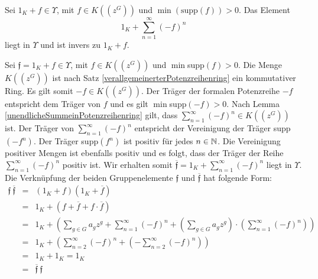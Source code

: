 %
%
%
%
%
%
%
%
%
%
%
%
%
%
%
%
%
\begin{lemma}
Sei $1_K + f \in \Upsilon$, mit $f \in K\left(\left(z^{G}\right)\right)$ und $\min(\text{supp}(f)) >0$. Das Element 
\[1_K +\sum_{n=1}^{\infty}(-f)^n\]
liegt in $\Upsilon$ und ist invers zu $1_K + f$.

\end{lemma}
Sei $\mathfrak{f} = 1_K + f \in \Upsilon$, mit $f \in K\left(\left(z^{G}\right)\right)$ und $\min$supp$(f) >0$. Die Menge $K\left(\left(z^{G}\right)\right)$ ist nach Satz \ref{verallgemeinerterPotenzreihenring} ein kommutativer Ring. Es gilt somit $-f \in K\left(\left(z^{G}\right)\right)$. Der Träger der formalen Potenzreihe $-f$ entspricht dem Träger von $f$ und es gilt $\min$supp$(-f) >0$. Nach Lemma \ref{unendlicheSummeinPotenzreihenring} gilt, dass $\sum_{n=1}^{\infty}(-f)^n \in K\left(\left(z^{G}\right)\right)$ ist. Der Träger von $\sum_{n=1}^{\infty}(-f)^n $ entspricht der Vereinigung der Träger supp$(-f^n)$. Der Träger supp$(f^n)$ ist positiv für jedes $n\in \mathbb{N}$. Die Vereinigung positiver Mengen ist ebenfalls positiv und es folgt, dass der Träger der Reihe $\sum_{n=1}^{\infty}(-f)^n $ positiv ist.
Wir erhalten somit $\overline{\mathfrak{f}} = 1_K +\sum_{n=1}^{\infty}(-f)^n $ liegt in $\Upsilon$. Die Verknüpfung der beiden Gruppenelemente $\mathfrak{f}$ und $ \overline{\mathfrak{f}}$ hat folgende Form:
%
%
%
%
\begin{eqnarray*}
\mathfrak{f}~ \overline{\mathfrak{f}} &=& \left(1_K + f\right) \left(1_K + \overline{f}\right) \\
&=& 1_K + \left(f + \overline{f} + f \cdot\overline{f}\right) \\
&=& 1_K + \left(\sum_{g \in G} a_g z^g + \sum_{n=1}^{\infty}(-f)^n + \left(\sum_{g \in G} a_g z^g\right)\cdot \left(\sum_{n=1}^{\infty}(-f)^n\right)\right) \\
&=& 1_K + \left( \sum_{n=2}^{\infty}(-f)^n + \left( - \sum_{n=2}^{\infty}(-f)^{n}\right)\right)\\
&=& 1_K + 1_K = 1_K \\
&=& \mathfrak{\overline{f}}~\mathfrak{f}
\end{eqnarray*}
